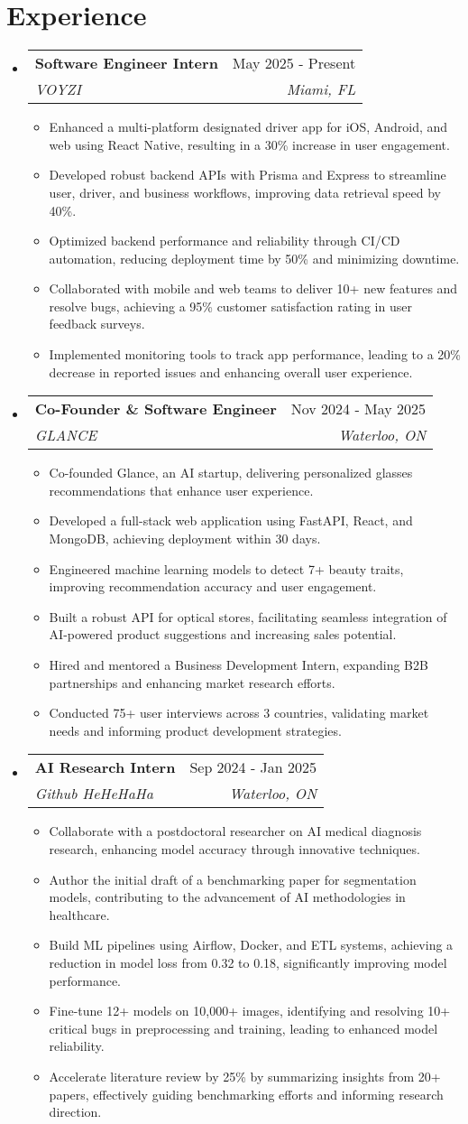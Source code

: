 \documentclass[letterpaper,11pt]{article}
\makeatletter
\newcommand{\resumeItem}[1]{
  \item\small{
    {#1 \vspace{-2pt}}
  }
}
\newcommand{\resumeSubheading}[4]{
  \vspace{-2pt}\item
    \begin{tabular*}{0.97\textwidth}[t]{l@{\extracolsep{\fill}}r}
      \textbf{#1} & #2 \\
      \textit{\small#3} & \textit{\small #4} \\
    \end{tabular*}\vspace{-7pt}
}
\newcommand{\resumeSubHeadingListStart}{\begin{itemize}[leftmargin=0.15in, label={}]}
\newcommand{\resumeSubHeadingListEnd}{\end{itemize}}
\newcommand{\resumeItemListStart}{\begin{itemize}}
\newcommand{\resumeItemListEnd}{\end{itemize}\vspace{-5pt}}
\makeatother
\begin{document}
\section{Experience}
  \resumeSubHeadingListStart
    \resumeSubheading
      {Software Engineer Intern}{May 2025 - Present}
      {VOYZI}{Miami, FL}
      \resumeItemListStart
        \resumeItem{Enhanced a multi-platform designated driver app for iOS, Android, and web using React Native, resulting in a 30\% increase in user engagement.}
        \resumeItem{Developed robust backend APIs with Prisma and Express to streamline user, driver, and business workflows, improving data retrieval speed by 40\%.}
        \resumeItem{Optimized backend performance and reliability through CI/CD automation, reducing deployment time by 50\% and minimizing downtime.}
        \resumeItem{Collaborated with mobile and web teams to deliver 10+ new features and resolve bugs, achieving a 95\% customer satisfaction rating in user feedback surveys.}
        \resumeItem{Implemented monitoring tools to track app performance, leading to a 20\% decrease in reported issues and enhancing overall user experience.}
      \resumeItemListEnd
    \resumeSubheading
      {Co-Founder \& Software Engineer}{Nov 2024 - May 2025}
      {GLANCE}{Waterloo, ON}
      \resumeItemListStart
        \resumeItem{Co-founded Glance, an AI startup, delivering personalized glasses recommendations that enhance user experience.}
        \resumeItem{Developed a full-stack web application using FastAPI, React, and MongoDB, achieving deployment within 30 days.}
        \resumeItem{Engineered machine learning models to detect 7+ beauty traits, improving recommendation accuracy and user engagement.}
        \resumeItem{Built a robust API for optical stores, facilitating seamless integration of AI-powered product suggestions and increasing sales potential.}
        \resumeItem{Hired and mentored a Business Development Intern, expanding B2B partnerships and enhancing market research efforts.}
        \resumeItem{Conducted 75+ user interviews across 3 countries, validating market needs and informing product development strategies.}
      \resumeItemListEnd
    \resumeSubheading
      {AI Research Intern}{Sep 2024 - Jan 2025}
      {Github HeHeHaHa}{Waterloo, ON}
      \resumeItemListStart
        \resumeItem{Collaborate with a postdoctoral researcher on AI medical diagnosis research, enhancing model accuracy through innovative techniques.}
        \resumeItem{Author the initial draft of a benchmarking paper for segmentation models, contributing to the advancement of AI methodologies in healthcare.}
        \resumeItem{Build ML pipelines using Airflow, Docker, and ETL systems, achieving a reduction in model loss from 0.32 to 0.18, significantly improving model performance.}
        \resumeItem{Fine-tune 12+ models on 10,000+ images, identifying and resolving 10+ critical bugs in preprocessing and training, leading to enhanced model reliability.}
        \resumeItem{Accelerate literature review by 25\% by summarizing insights from 20+ papers, effectively guiding benchmarking efforts and informing research direction.}
      \resumeItemListEnd
  \resumeSubHeadingListEnd
\end{document}
